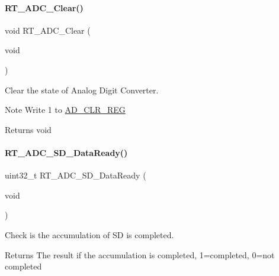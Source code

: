 \paragraph{\texorpdfstring{R\+T\+\_\+\+A\+D\+C\+\_\+\+Clear()}{RT\_ADC\_Clear()}}
{\footnotesize\ttfamily void R\+T\+\_\+\+A\+D\+C\+\_\+\+Clear (\begin{DoxyParamCaption}\item[{void}]{ }\end{DoxyParamCaption})}



Clear the state of Analog Digit Converter. 

\begin{DoxyNote}{Note}
Write 1 to \mbox{\hyperlink{a00020_adadaa0ab1ebbd7ba9b70dfd24c3ed44da03a55605f114ad34a5768f096cec3d9d}{A\+D\+\_\+\+C\+L\+R\+\_\+\+R\+EG}} 
\end{DoxyNote}
\begin{DoxyReturn}{Returns}
void 
\end{DoxyReturn}
\mbox{\label{a00002_a7fd97b414a33170e6013c88f37e028a9}} 
\paragraph{\texorpdfstring{R\+T\+\_\+\+A\+D\+C\+\_\+\+S\+D\+\_\+\+Data\+Ready()}{RT\_ADC\_SD\_DataReady()}}
{\footnotesize\ttfamily uint32\+\_\+t R\+T\+\_\+\+A\+D\+C\+\_\+\+S\+D\+\_\+\+Data\+Ready (\begin{DoxyParamCaption}\item[{void}]{ }\end{DoxyParamCaption})}



Check is the accumulation of SD is completed. 

\begin{DoxyReturn}{Returns}
The result if the accumulation is completed, 1=completed, 0=not completed 
\end{DoxyReturn}
\mbox{\label{a00002_a1934526cb3d40a1b0ae7a0f19597a4ff}} 
